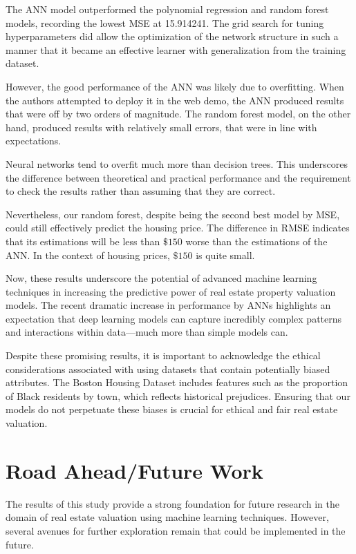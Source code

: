 \documentclass[conference, 11pt]{IEEEtran}
\begin{document}
The ANN model outperformed the polynomial regression and random forest models, recording the lowest MSE at 15.914241. The grid search for tuning hyperparameters did allow the optimization of the network structure in such a manner that it became an effective learner with generalization from the training dataset. 

However, the good performance of the ANN was likely due to overfitting. When the authors attempted to deploy it in the web demo, the ANN produced results that were off by two orders of magnitude. The random forest model, on the other hand, produced results with relatively small errors, that were in line with expectations. 

Neural networks tend to overfit much more than decision trees. This underscores the difference between theoretical and practical performance and the requirement to check the results rather than assuming that they are correct.

Nevertheless, our random forest, despite being the second best model by MSE, could still effectively predict the housing price. The difference in RMSE indicates that its estimations will be less than $\$150$ worse than the estimations of the ANN. In the context of housing prices, $\$150$ is quite small.

Now, these results underscore the potential of advanced machine learning techniques in increasing the predictive power of real estate property valuation models. The recent dramatic increase in performance by ANNs highlights an expectation that deep learning models can capture incredibly complex patterns and interactions within data—much more than simple models can.

Despite these promising results, it is important to acknowledge the ethical considerations associated with using datasets that contain potentially biased attributes. The Boston Housing Dataset includes features such as the proportion of Black residents by town, which reflects historical prejudices. Ensuring that our models do not perpetuate these biases is crucial for ethical and fair real estate valuation.

\section{Road Ahead/Future Work}
The results of this study provide a strong foundation for future research in the domain of real estate valuation using machine learning techniques. However, several avenues for further exploration remain that could be implemented in the future.
\end{document}
